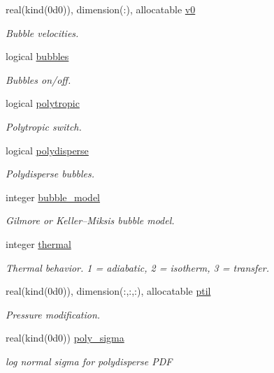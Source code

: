 \begin{Indent}
\begin{DoxyCompactItemize}
real(kind(0d0)), dimension(\+:), allocatable \hyperlink{namespacem__global__parameters_a334b440356a4353d073c43e68c2372da}{v0}
\begin{DoxyCompactList}\small\item\em Bubble velocities. \end{DoxyCompactList}\item 
logical \hyperlink{namespacem__global__parameters_a4a22ed160838f8fbe6bd506f334b8815}{bubbles}
\begin{DoxyCompactList}\small\item\em Bubbles on/off. \end{DoxyCompactList}\item 
logical \hyperlink{namespacem__global__parameters_a8d670f2f984167bae71b7b3f12d0908a}{polytropic}
\begin{DoxyCompactList}\small\item\em Polytropic switch. \end{DoxyCompactList}\item 
logical \hyperlink{namespacem__global__parameters_a32791d9d5fef0213f01fc31713b17ae8}{polydisperse}
\begin{DoxyCompactList}\small\item\em Polydisperse bubbles. \end{DoxyCompactList}\item 
integer \hyperlink{namespacem__global__parameters_aef0de5da0e41de495e9fe67accd62d77}{bubble\+\_\+model}
\begin{DoxyCompactList}\small\item\em Gilmore or Keller--Miksis bubble model. \end{DoxyCompactList}\item 
integer \hyperlink{namespacem__global__parameters_a17169a5387f8f1efd5ac34cb4eae7c81}{thermal}
\begin{DoxyCompactList}\small\item\em Thermal behavior. 1 = adiabatic, 2 = isotherm, 3 = transfer. \end{DoxyCompactList}\item 
real(kind(0d0)), dimension(\+:,\+:,\+:), allocatable \hyperlink{namespacem__global__parameters_ac6ff480000eaa7af51481d0f17b78423}{ptil}
\begin{DoxyCompactList}\small\item\em Pressure modification. \end{DoxyCompactList}\item 
real(kind(0d0)) \hyperlink{namespacem__global__parameters_a29164826db891e5662ce2bccdbc57d3c}{poly\+\_\+sigma}
\begin{DoxyCompactList}\small\item\em log normal sigma for polydisperse P\+DF \end{DoxyCompactList}\end{DoxyCompactItemize}
\end{Indent}
